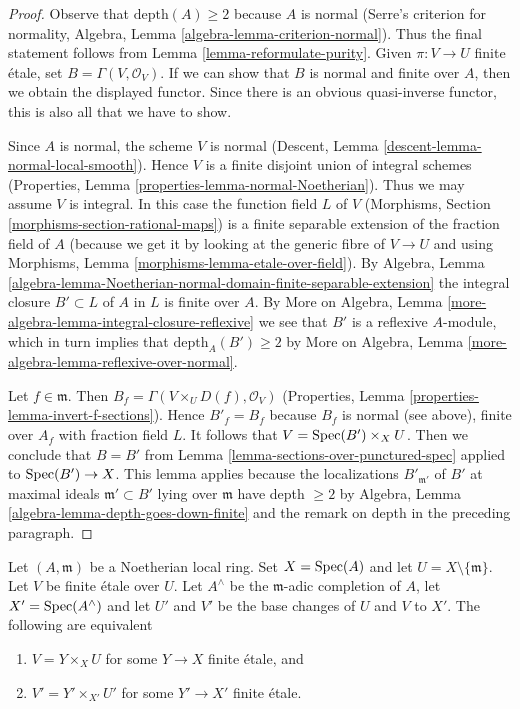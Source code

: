 \begin{proof}
Observe that $\text{depth}(A) \geq 2$ because $A$ is normal
(Serre's criterion for normality, Algebra, Lemma
\ref{algebra-lemma-criterion-normal}).
Thus the final statement follows from Lemma \ref{lemma-reformulate-purity}.
Given $\pi : V \to U$ finite \'etale, set $B = \Gamma(V, \mathcal{O}_V)$.
If we can show that $B$ is normal and finite over $A$, then
we obtain the displayed functor. Since there is an obvious
quasi-inverse functor, this is also all that we have to show.

\medskip\noindent
Since $A$ is normal, the scheme $V$ is normal
(Descent, Lemma \ref{descent-lemma-normal-local-smooth}).
Hence $V$ is a finite disjoint union of integral schemes
(Properties, Lemma \ref{properties-lemma-normal-Noetherian}).
Thus we may assume $V$ is integral.
In this case the function field $L$ of $V$
(Morphisms, Section \ref{morphisms-section-rational-maps})
is a finite separable extension of the fraction field of $A$
(because we get it by looking at the generic fibre
of $V \to U$ and using Morphisms, Lemma
\ref{morphisms-lemma-etale-over-field}).
By Algebra, Lemma
\ref{algebra-lemma-Noetherian-normal-domain-finite-separable-extension}
the integral closure $B' \subset L$ of $A$ in $L$ is finite over $A$.
By More on Algebra, Lemma \ref{more-algebra-lemma-integral-closure-reflexive}
we see that $B'$ is a reflexive $A$-module, which in turn implies
that $\text{depth}_A(B') \geq 2$ by
More on Algebra, Lemma \ref{more-algebra-lemma-reflexive-over-normal}.

\medskip\noindent
Let $f \in \mathfrak m$. Then $B_f = \Gamma(V \times_U D(f), \mathcal{O}_V)$
(Properties, Lemma \ref{properties-lemma-invert-f-sections}).
Hence $B'_f = B_f$ because $B_f$ is normal (see above),
finite over $A_f$ with fraction field $L$.
It follows that $V = \mathop{\mathrm{Spec}}(B') \times_X U$.
Then we conclude that $B = B'$ from
Lemma \ref{lemma-sections-over-punctured-spec}
applied to $\mathop{\mathrm{Spec}}(B') \to X$.
This lemma applies because the localizations $B'_{\mathfrak m'}$
of $B'$ at maximal ideals $\mathfrak m' \subset B'$ lying over
$\mathfrak m$ have depth $\geq 2$ by
Algebra, Lemma \ref{algebra-lemma-depth-goes-down-finite}
and the remark on depth in the preceding paragraph.
\end{proof}

\begin{lemma}
\label{lemma-purity-and-completion}
Let $(A, \mathfrak m)$ be a Noetherian local ring. Set $X = \mathop{\mathrm{Spec}}(A)$
and let $U = X \setminus \{\mathfrak m\}$.
Let $V$ be finite \'etale over $U$.
Let $A^\wedge$ be the $\mathfrak m$-adic completion of $A$,
let $X' = \mathop{\mathrm{Spec}}(A^\wedge)$ and let $U'$ and $V'$ be the base changes of
$U$ and $V$ to $X'$. The following are equivalent
\begin{enumerate}
\item $V = Y \times_X U$ for some $Y \to X$ finite \'etale, and
\item $V' = Y' \times_{X'} U'$ for some $Y' \to X'$ finite \'etale.
\end{enumerate}
\end{lemma}

